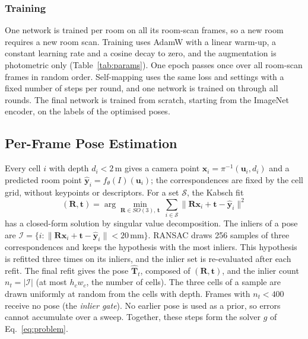 \documentclass[9pt,shortpaper,twoside,web]{ieeecolor2}
\begin{document}
\subsubsection{Training} One network is trained per room on all its room-scan frames, so a new room requires a new room scan. Training uses AdamW with a linear warm-up, a constant learning rate and a cosine decay to zero, and the augmentation is photometric only (Table~\ref{tab:params}). One epoch passes once over all room-scan frames in random order. Self-mapping uses the same loss and settings with a fixed number of steps per round, and one network is trained on through all rounds. The final network is trained from scratch, starting from the ImageNet encoder, on the labels of the optimised poses.

\subsection{Per-Frame Pose Estimation}
\label{sec:pose}
Every cell $i$ with depth $d_i<2$\,m gives a camera point $\mathbf{x}_i=\pi^{-1}(\mathbf{u}_i,d_i)$ and a predicted room point $\hat{\mathbf{y}}_i=f_\theta(I)(\mathbf{u}_i)$; the correspondences are fixed by the cell grid, without keypoints or descriptors. For a set $\mathcal{S}$, the Kabsch fit \cite{kabsch1976}
\begin{equation}
  (\mathbf{R},\mathbf{t})=\arg\min_{\mathbf{R}\in SO(3),\,\mathbf{t}}\ \sum_{i\in\mathcal{S}}\|\mathbf{R}\mathbf{x}_i+\mathbf{t}-\hat{\mathbf{y}}_i\|^2
  \label{eq:kabsch}
\end{equation}
has a closed-form solution by singular value decomposition. The inliers of a pose are $\mathcal{I}=\{i:\|\mathbf{R}\mathbf{x}_i+\mathbf{t}-\hat{\mathbf{y}}_i\|<20\,\mathrm{mm}\}$. RANSAC \cite{fischler1981ransac} draws 256 samples of three correspondences and keeps the hypothesis with the most inliers. This hypothesis is refitted three times on its inliers, and the inlier set is re-evaluated after each refit. The final refit gives the pose $\hat{\mathbf{T}}_t$, composed of $(\mathbf{R},\mathbf{t})$, and the inlier count $n_t=|\mathcal{I}|$ (at most $h_cw_c$, the number of cells). The three cells of a sample are drawn uniformly at random from the cells with depth. Frames with $n_t<400$ receive no pose (the \emph{inlier gate}). No earlier pose is used as a prior, so errors cannot accumulate over a sweep. Together, these steps form the solver $g$ of Eq.~\eqref{eq:problem}.
\end{document}
